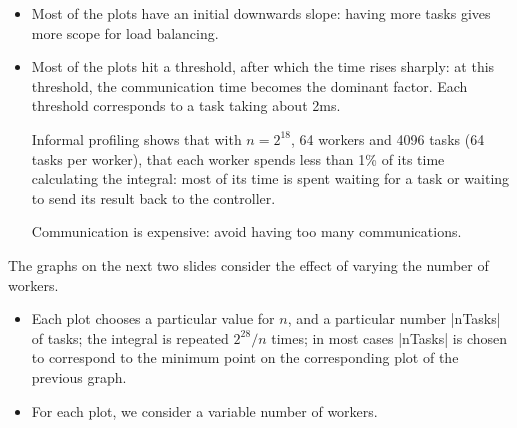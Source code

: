 

\begin{slide}

\begin{itemize}
\item Most of the plots have an initial downwards slope: having more tasks
gives more scope for load balancing.

\item Most of the plots hit a threshold, after which the time rises sharply:
at this threshold, the communication time becomes the dominant factor.
Each threshold corresponds to a task taking about 2ms.

Informal profiling shows that with $n = 2^{18}$, 64 workers and 4096 tasks (64
tasks per worker), that each worker spends less than 1\% of its time
calculating the integral: most of its time is spent waiting for a task or
waiting to send its result back to the controller. 

Communication is expensive: avoid having too many communications. 

\end{itemize}
\end{slide}


\begin{slide}

The graphs on the next two slides consider the effect of varying the number of
workers.
%
\begin{itemize}
\item Each plot chooses a particular value for $n$, and a particular number
|nTasks| of tasks; the integral is repeated $2^{28}/n$ times; in most cases
|nTasks| is chosen to correspond to the minimum point on the corresponding
plot of the previous graph.

\item For each plot, we consider a variable number of workers.
\end{itemize}
\end{slide}


